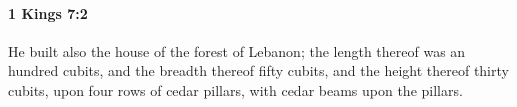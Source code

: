 
		\paragraph{1 Kings 7:2} %
			\label{1KINGS-7-2}

			He built also the house of the forest of Lebanon; the length thereof was an hundred cubits, and the breadth thereof fifty cubits, and the height thereof thirty cubits, upon four rows of cedar pillars, with cedar beams upon the pillars.


